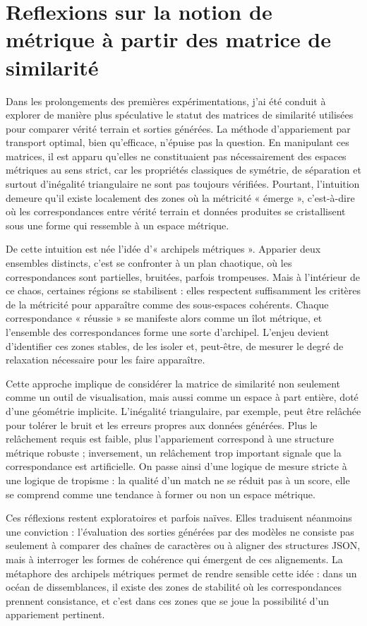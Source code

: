\section{Reflexions sur la notion de métrique à partir des matrice de similarité}

Dans les prolongements des premières expérimentations, j’ai été conduit à explorer de manière plus spéculative le statut des matrices de similarité utilisées pour comparer vérité terrain et sorties générées. La méthode d’appariement par transport optimal, bien qu’efficace, n’épuise pas la question. En manipulant ces matrices, il est apparu qu’elles ne constituaient pas nécessairement des espaces métriques au sens strict, car les propriétés classiques de symétrie, de séparation et surtout d’inégalité triangulaire ne sont pas toujours vérifiées. Pourtant, l’intuition demeure qu’il existe localement des zones où la métricité « émerge », c’est-à-dire où les correspondances entre vérité terrain et données produites se cristallisent sous une forme qui ressemble à un espace métrique.

De cette intuition est née l’idée d’« archipels métriques ». Apparier deux ensembles distincts, c’est se confronter à un plan chaotique, où les correspondances sont partielles, bruitées, parfois trompeuses. Mais à l’intérieur de ce chaos, certaines régions se stabilisent : elles respectent suffisamment les critères de la métricité pour apparaître comme des sous-espaces cohérents. Chaque correspondance « réussie » se manifeste alors comme un îlot métrique, et l’ensemble des correspondances forme une sorte d’archipel. L’enjeu devient d’identifier ces zones stables, de les isoler et, peut-être, de mesurer le degré de relaxation nécessaire pour les faire apparaître.

Cette approche implique de considérer la matrice de similarité non seulement comme un outil de visualisation, mais aussi comme un espace à part entière, doté d’une géométrie implicite. L’inégalité triangulaire, par exemple, peut être relâchée pour tolérer le bruit et les erreurs propres aux données générées. Plus le relâchement requis est faible, plus l’appariement correspond à une structure métrique robuste ; inversement, un relâchement trop important signale que la correspondance est artificielle. On passe ainsi d’une logique de mesure stricte à une logique de tropisme : la qualité d’un match ne se réduit pas à un score, elle se comprend comme une tendance à former ou non un espace métrique.

Ces réflexions restent exploratoires et parfois naïves. Elles traduisent néanmoins une conviction : l’évaluation des sorties générées par des modèles ne consiste pas seulement à comparer des chaînes de caractères ou à aligner des structures JSON, mais à interroger les formes de cohérence qui émergent de ces alignements. La métaphore des archipels métriques permet de rendre sensible cette idée : dans un océan de dissemblances, il existe des zones de stabilité où les correspondances prennent consistance, et c’est dans ces zones que se joue la possibilité d’un appariement pertinent.

